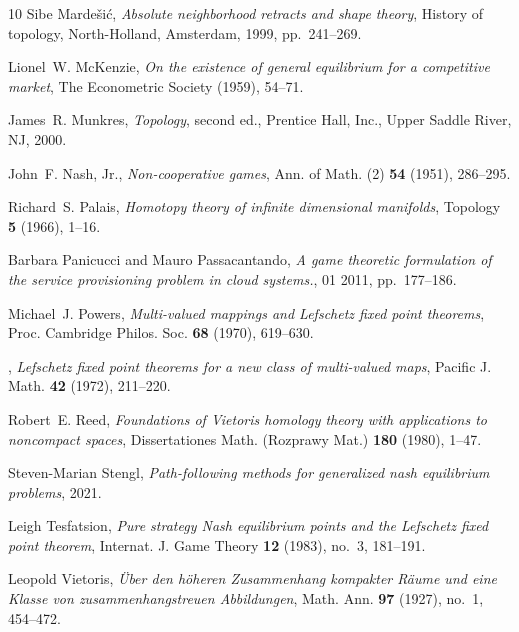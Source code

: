 \documentclass[a4paper,11pt,reqno,english]{amsart}
\theoremstyle{definition}
\begin{document}
\begin{thebibliography}{10}
	Sibe Marde\v{s}i\'{c}, \emph{Absolute neighborhood retracts and shape theory}, History of topology, North-Holland, Amsterdam, 1999, pp.~241--269.

	Lionel~W. McKenzie, \emph{On the existence of general equilibrium for a competitive market}, The Econometric Society (1959), 54--71.

	James~R. Munkres, \emph{Topology}, second ed., Prentice Hall, Inc., Upper Saddle River, NJ, 2000.

	John~F. Nash, Jr., \emph{Non-cooperative games}, Ann. of Math. (2) \textbf{54} (1951), 286--295.

	Richard~S. Palais, \emph{Homotopy theory of infinite dimensional manifolds}, Topology \textbf{5} (1966), 1--16.

	Barbara Panicucci and Mauro Passacantando, \emph{A game theoretic formulation of the service provisioning problem in cloud systems.}, 01 2011, pp.~177--186.

	Michael~J. Powers, \emph{Multi-valued mappings and {L}efschetz fixed point theorems}, Proc. Cambridge Philos. Soc. \textbf{68} (1970), 619--630.

	\bysame, \emph{Lefschetz fixed point theorems for a new class of multi-valued maps}, Pacific J. Math. \textbf{42} (1972), 211--220.

	Robert~E. Reed, \emph{Foundations of {V}ietoris homology theory with applications to noncompact spaces}, Dissertationes Math. (Rozprawy Mat.) \textbf{180} (1980), 1--47.

	Steven-Marian Stengl, \emph{Path-following methods for generalized nash equilibrium problems}, 2021.

	Leigh Tesfatsion, \emph{Pure strategy {N}ash equilibrium points and the {L}efschetz fixed point theorem}, Internat. J. Game Theory \textbf{12} (1983), no.~3, 181--191.

	Leopold Vietoris, \emph{\"{U}ber den h\"{o}heren {Z}usammenhang kompakter {R}\"{a}ume und eine {K}lasse von zusammenhangstreuen {A}bbildungen}, Math. Ann. \textbf{97} (1927), no.~1, 454--472.

\end{thebibliography}
\end{document}
